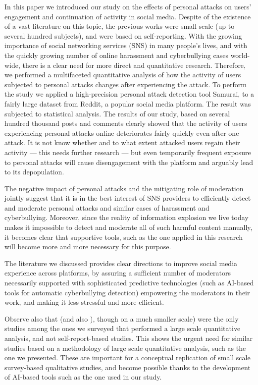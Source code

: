 \documentclass[a4paper,fleqn]{cas-dc}
\begin{document}
In this paper we introduced our study on the effects of personal attacks
on users' engagement and continuation of activity in social media.
Despite of the existence of a vast literature on this topic, the
previous works were small-scale (up to several hundred subjects), and
were based on self-reporting. With the growing importance of social
networking services (SNS) in many people's lives, and with the quickly
growing number of online harassment and cyberbullying cases world-wide,
there is a clear need for more direct and quantitative research.
Therefore, we performed a multifaceted quantitative analysis of how the
activity of users subjected to personal attacks changes after
experiencing the attack. To perform the study we applied a
high-precision personal attack detection tool \textsf{Samurai,} to a
fairly large dataset from Reddit, a popular social media platform. The
result was subjected to statistical analysis. The results of our study,
based on several hundred thousand posts and comments clearly showed that
the activity of users experiencing personal attacks online deteriorates
fairly quickly even after one attack. It is not know whether and to what
extent attacked users regain their activity --- this needs further
research --- but even temporarily frequent exposure to personal attacks
will cause disengagement with the platform and arguably lead to its
depopulation.

The negative impact of personal attacks and the mitigating role of
moderation jointly suggest that it is in the best interest of SNS
providers to efficiently detect and moderate personal attacks and
similar cases of harassment and cyberbullying. Moreover, since the
reality of information explosion we live today makes it impossible to
detect and moderate all of such harmful content manually, it becomes
clear that supportive tools, such as the one applied in this research
will become more and more necessary for this purpose.

The literature we discussed provides clear directions to improve social
media experience across platforms, by assuring a sufficient number of
moderators necessarily supported with sophisticated predictive
technologies (such as AI-based tools for automatic cyberbullying
detection) empowering the moderators in their work, and making it less
stressful and more efficient.

Observe also that \citep{chandrasekharan2017you} (and also \citep{pudipeddi2014user}), though on a much smaller scale) were the only studies among
the ones we surveyed that performed a large scale quantitative analysis,
and not self-report-based studies. This shows the urgent need for
similar studies based on a methodology of large scale quantitative
analysis, such as the one we presented. These are important for a
conceptual replication of small scale survey-based qualitative studies,
and become possible thanks to the development of AI-based tools such as
the one used in our study.
\end{document}
